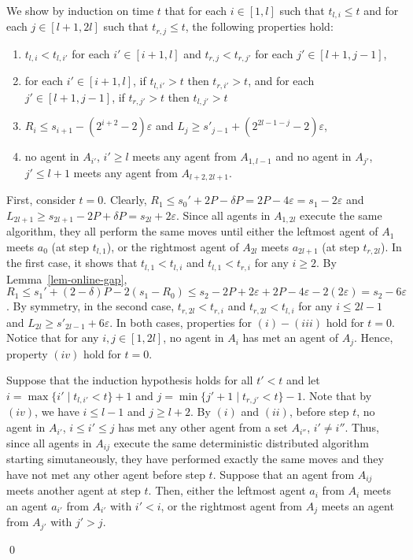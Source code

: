 \documentclass{article}
\newenvironment{proofof}[1]{\medskip\noindent {\bf Proof of #1 : }} { \qed \medskip }
\begin{document}
\begin{proofof}{Theorem \ref{thm:TwoAprOpt}}
We show by induction on time $t$ that for each $i \in [1,l]$ such that
$t_{l,i} \leq t$ and for each $j \in [l+1,2l]$ such that $t_{r,j} \leq
t$, the following properties hold:
\begin{enumerate}[$(i)$]
\item $t_{l,i} < t_{l,i'}$ for each $i' \in [i+1,l]$ and $t_{r,j} < t_{r,j'}$
  for each $j' \in [l+1,j-1]$, 
\item for each $i' \in [i+1,l]$, if $t_{l,i'} > t$ then $t_{r,i'} > t$, and
  for each $j' \in [l+1,j-1]$, if $t_{r,j'} > t$ then $t_{l,j'} > t$ 
\item $R_i \leq s_{i+1}-(2^{i+2}-2)\varepsilon$ and  $L_{j} \geq
s'_{j-1} + (2^{2l-1-j}-2)\varepsilon$,
\item no agent in $A_{i'}$, $i' \geq l$ meets
  any agent from $A_{1,l-1}$ and no agent in $A_{j'}$, $j'\leq l+1$
  meets any agent from $A_{l+2,2l+1}$.
\end{enumerate}

First, consider $t=0$.
Clearly, $R_1 \leq s_0' + 2P-\delta P = 2P - 4\varepsilon = s_1 -
2\varepsilon$ and $L_{2l+1} \geq s_{2l+1} - 2P +\delta P =
s_{2l} +2 \varepsilon$. Since all agents in $A_{1,2l}$ execute the
same algorithm, they all perform the same moves until either the
leftmost agent of $A_1$ meets $a_0$ (at step $t_{l,1}$), or the rightmost
agent of $A_{2l}$ meets $a_{2l+1}$ (at step $t_{r,2l}$). In the
first case, it shows that $t_{l,1} < t_{l,i}$ and $t_{l,1} < t_{r,i}$ for any $i\geq 2$.
By Lemma~\ref{lem-online-gap}, $R_1 \leq s_1' +
(2-\delta)P-2(s_1-R_0) \leq s_2-2P+2\varepsilon + 2P -4\varepsilon
-2(2\varepsilon) = s_2- 6\varepsilon$.  By symmetry, in the second case,
$t_{r,2l} < t_{r,i}$ and $t_{r,2l} < t_{l,i}$ for any $i\leq 2l-1$ and $L_{2l} \geq
s'_{2l-1}+6\varepsilon$. In both cases, properties for $(i)-(iii)$ hold for $t=0$.
Notice that for any $i,j\in [1,2l]$, no agent in $A_i$ has met an agent of $A_j$.
Hence, property $(iv)$ hold for $t=0$.


Suppose that the induction hypothesis holds for all $t' < t$ and let $i =
\max \{i' \mid t_{l,i'} < t\}+1$ and $j = \min \{j' +1 \mid t_{r,j'} <
t\} - 1$. Note that by $(iv)$, we have $i \leq l-1$ and $j \geq l+2$.
By $(i)$ and $(ii)$, before step $t$, no agent in $A_{i'}$, $i \leq i'
\leq j$ has met any other agent from a set $A_{i''}$, $i' \neq
i''$. Thus, since all agents in $A_{ij}$ execute the same deterministic distributed algorithm starting simutaneously,
they have performed exactly the same moves and they have not met any
other agent before step $t$.  Suppose that an agent from $A_{ij}$
meets another agent at step $t$. Then, either the leftmost agent $a_i$
from $A_i$ meets an agent $a_{i'}$ from $A_{i'}$ with $i' < i$, or the
rightmost agent from $A_j$ meets an agent from $A_{j'}$ with $j' > j$.


\end{proofof}
\end{document}
